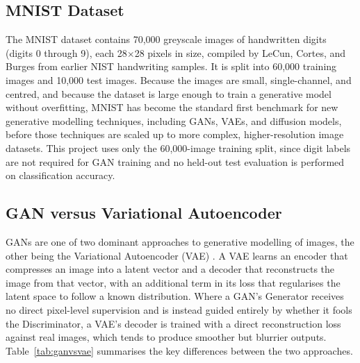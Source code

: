 \documentclass[12pt,a4paper]{article}
\begin{document}
\subsection{MNIST Dataset}

The MNIST dataset \cite{lecun1998} contains 70,000 greyscale images of handwritten digits
(digits 0 through 9), each 28$\times$28 pixels in size, compiled by LeCun, Cortes, and
Burges from earlier NIST handwriting samples. It is split into 60,000 training images and
10,000 test images. Because the images are small, single-channel, and centred, and
because the dataset is large enough to train a generative model without overfitting, MNIST
has become the standard first benchmark for new generative modelling techniques,
including GANs, VAEs, and diffusion models, before those techniques are scaled up to more
complex, higher-resolution image datasets. This project uses only the 60,000-image
training split, since digit labels are not required for GAN training and no held-out
test evaluation is performed on classification accuracy.

\subsection{GAN versus Variational Autoencoder}

GANs are one of two dominant approaches to generative modelling of images, the other
being the Variational Autoencoder (VAE) \cite{kingma2013}. A VAE learns an encoder that
compresses an image into a latent vector and a decoder that reconstructs the image from
that vector, with an additional term in its loss that regularises the latent space to
follow a known distribution. Where a GAN's Generator receives no direct pixel-level
supervision and is instead guided entirely by whether it fools the Discriminator, a VAE's
decoder is trained with a direct reconstruction loss against real images, which tends to
produce smoother but blurrier outputs. Table~\ref{tab:ganvsvae} summarises the key
differences between the two approaches.
\end{document}
